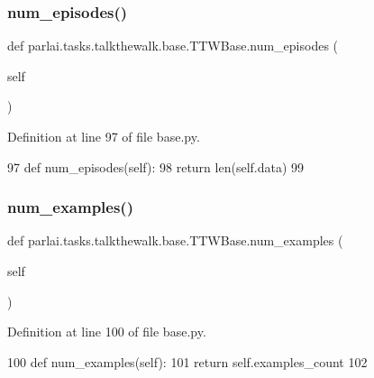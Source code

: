 \subsubsection{\texorpdfstring{num\+\_\+episodes()}{num\_episodes()}}
{\footnotesize\ttfamily def parlai.\+tasks.\+talkthewalk.\+base.\+T\+T\+W\+Base.\+num\+\_\+episodes (\begin{DoxyParamCaption}\item[{}]{self }\end{DoxyParamCaption})}



Definition at line 97 of file base.\+py.


\begin{DoxyCode}
97     \textcolor{keyword}{def }num\_episodes(self):
98         \textcolor{keywordflow}{return} len(self.data)
99 
\end{DoxyCode}
\mbox{\label{classparlai_1_1tasks_1_1talkthewalk_1_1base_1_1TTWBase_a691d7f4a22c6ea032489ea70fe5d6b35}} 
\subsubsection{\texorpdfstring{num\+\_\+examples()}{num\_examples()}}
{\footnotesize\ttfamily def parlai.\+tasks.\+talkthewalk.\+base.\+T\+T\+W\+Base.\+num\+\_\+examples (\begin{DoxyParamCaption}\item[{}]{self }\end{DoxyParamCaption})}



Definition at line 100 of file base.\+py.


\begin{DoxyCode}
100     \textcolor{keyword}{def }num\_examples(self):
101         \textcolor{keywordflow}{return} self.examples\_count
102 \end{DoxyCode}
\mbox{\label{classparlai_1_1tasks_1_1talkthewalk_1_1base_1_1TTWBase_ac8cfd853c90d3dbc0ee6ada6dbc23726}} 
